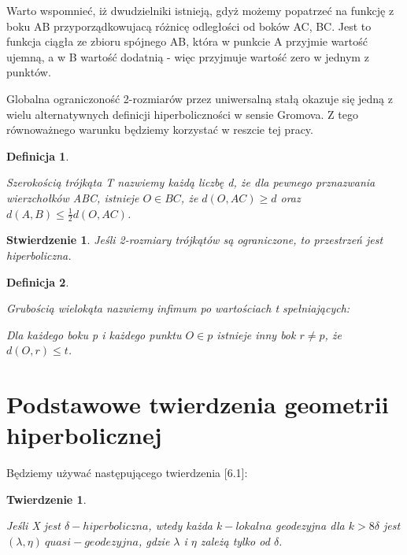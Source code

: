 \documentclass[licencjacka]{pracamgr}
\newtheorem{defi}{Definicja}[section]
\newtheorem{ther}{Twierdzenie}[section]
\newtheorem{stmt}{Stwierdzenie}[section]
\begin{document}
Warto wspomnieć, iż dwudzielniki istnieją, gdyż możemy popatrzeć na funkcję z boku AB przyporządkowujacą różnicę odległości od boków AC, BC. Jest to funkcja ciągła ze zbioru spójnego AB, która w punkcie A przyjmie wartość ujemną, a w B wartość dodatnią - więc przyjmuje wartość zero w jednym z punktów.

Globalna ograniczoność 2-rozmiarów przez uniwersalną stałą okazuje się jedną z wielu alternatywnych definicji hiperboliczności w sensie Gromova. Z tego równoważnego warunku będziemy korzystać w reszcie tej pracy.

\begin{defi}\label{Traingle width}

Szerokością trójkąta T nazwiemy każdą liczbę d, że dla pewnego prznazwania wierzchołków ABC, istnieje $O \in BC$, że $d(O, AC) \geq d$ oraz $d(A, B)  \leq \frac{1}{2} d(O, AC)$.

\end{defi}

\begin{stmt}

Jeśli 2-rozmiary trójkątów są ograniczone, to przestrzeń jest hiperboliczna.

\end{stmt}

\begin{defi}\label{Thickness of polygon}

Grubością wielokąta nazwiemy infimum po wartościach t spełniających:

Dla każdego boku p i każdego punktu $O \in p$ istnieje inny bok $r \neq p$, że $d(O, r) \leq t$.

\end{defi}

\section{Podstawowe twierdzenia geometrii hiperbolicznej}

Będziemy używać następującego twierdzenia \cite{bib:hyperbolicity_and_thw_word_problem}[6.1]:

\begin{ther}\label{thm:local_geodesic_is_quasi}

Jeśli X jest $\delta - hiperboliczna$, wtedy każda $k-lokalna$ geodezyjna dla $k > 8\delta$ jest $(\lambda, \eta)\  quasi-geodezyjna$, gdzie $\lambda$ i $\eta$ zależą tylko od $\delta$.

\end{ther}
\end{document}
